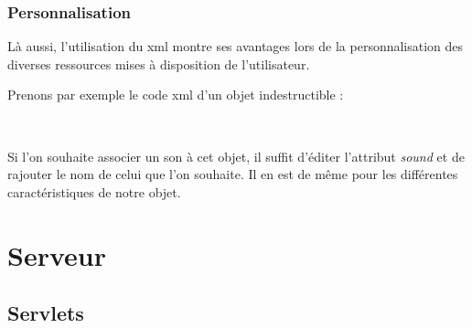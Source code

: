 		\subsubsection{Personnalisation}
	
			Là aussi, l'utilisation du \gls{xml} montre ses avantages lors de la personnalisation
			des diverses ressources mises à disposition de l'utilisateur.
			
			Prenons par exemple le code \gls{xml} d'un objet indestructible :
			
			$\,$
		
			\begin{footnotesize}
				
			\end{footnotesize}
			
			Si l'on souhaite associer un son à cet objet, il suffit d'éditer l'attribut \emph{sound}
			et de rajouter le nom de celui que l'on souhaite.
			Il en est de même pour les différentes caractéristiques de notre objet.		

\section{Serveur}

	\subsection{Servlets}